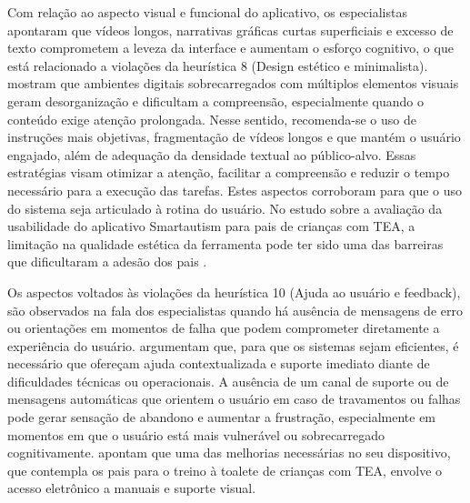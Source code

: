 \documentclass[portuguese]{textolivre}
\begin{document}
Com relação ao aspecto visual e funcional do aplicativo, os especialistas apontaram que vídeos longos, narrativas gráficas curtas superficiais e excesso de texto comprometem a leveza da interface e aumentam o esforço cognitivo, o que está relacionado a violações da heurística 8 (Design estético e minimalista). \textcite{labrie2020adapting} mostram que ambientes digitais sobrecarregados com múltiplos elementos visuais geram desorganização e dificultam a compreensão, especialmente quando o conteúdo exige atenção prolongada. Nesse sentido, recomenda-se o uso de instruções mais objetivas, fragmentação de vídeos longos e que mantém o usuário engajado, além de adequação da densidade textual ao público-alvo. Essas estratégias visam otimizar a atenção, facilitar a compreensão e reduzir o tempo necessário para a execução das tarefas. Estes aspectos corroboram para que o uso do sistema seja articulado à rotina do usuário. No estudo sobre a avaliação da usabilidade do aplicativo Smartautism para pais de crianças com TEA, a limitação na qualidade estética da ferramenta pode ter sido uma das barreiras que dificultaram a adesão dos pais \cite{bonnot2021mobile}.

Os aspectos voltados às violações da heurística 10 (Ajuda ao usuário e feedback), são observados na fala dos especialistas quando há ausência de mensagens de erro ou orientações em momentos de falha que podem comprometer diretamente a experiência do usuário. \textcite{shen2024evaluating} argumentam que, para que os sistemas sejam eficientes, é necessário que ofereçam ajuda contextualizada e suporte imediato diante de dificuldades técnicas ou operacionais. A ausência de um canal de suporte ou de mensagens automáticas que orientem o usuário em caso de travamentos ou falhas pode gerar sensação de abandono e aumentar a frustração, especialmente em momentos em que o usuário está mais vulnerável ou sobrecarregado cognitivamente. \textcite{mruzek2019toilettraining} apontam que uma das melhorias necessárias no seu dispositivo, que contempla os pais para o treino à toalete de crianças com TEA, envolve o acesso eletrônico a manuais e suporte visual.
\end{document}
